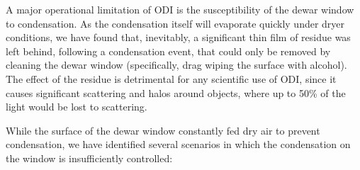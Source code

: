 \documentclass[]{spieman}
\begin{document}
A major operational limitation of ODI is the susceptibility of the dewar window
to condensation. As the condensation itself will evaporate quickly under dryer
conditions, we have found that, inevitably, a significant thin film of residue was 
left behind, following a condensation event, that could only be removed by cleaning the dewar window (specifically, drag wiping the surface with alcohol). The
effect of the residue is detrimental for any scientific use of ODI, since
it causes significant scattering and halos around objects, where up to 50\%  of
the light would be lost to scattering.

While the surface of the dewar window constantly fed dry air to prevent condensation,
we have identified several scenarios in which the condensation  on the window is
insufficiently controlled:
\end{document}
